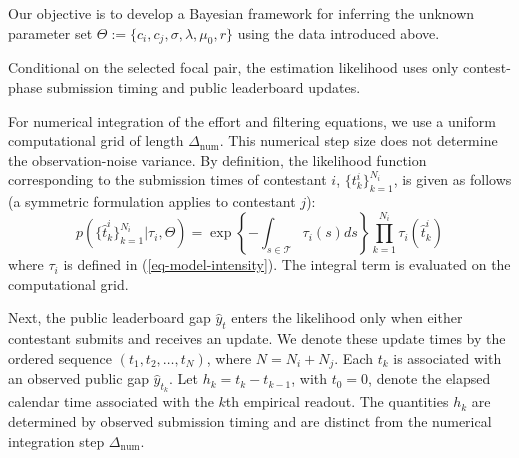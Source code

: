 \documentclass[mnsc]{informs3}
\begin{document}
Our objective is to develop a Bayesian framework for inferring the unknown parameter set $\Theta := \{ c_i, c_j, \sigma, \lambda, \mu_0,r \}$ using the data introduced above.

Conditional on the selected focal pair, the estimation likelihood uses only contest-phase submission timing and public leaderboard updates.

For numerical integration of the effort and filtering equations, we use a uniform computational grid of length $\Delta_{\mathrm{num}}$. This numerical step size does not determine the observation-noise variance.
By definition, the likelihood function corresponding to the submission times of contestant $i$, $\{t^i_k\}_{k=1}^{N_i}$, is given as follows (a symmetric formulation applies to contestant $j$):
\begin{equation}\label{eq-ihpp-prob}
p\left(\{\hat{t}^i_k\}_{k=1}^{N_i} | \tau_i, \Theta\right) = \exp\left\{-\int_{s\in\mathcal{T}}\tau_i(s)ds\right\}\prod_{k=1}^{N_i}\tau_i(\hat{t}^i_k)
\end{equation}
where $\tau_i$ is defined in (\ref{eq-model-intensity}).
The integral term is evaluated on the computational grid.

Next, the public leaderboard gap $\hat y_t$ enters the likelihood only when either contestant submits and receives an update.
We denote these update times by the ordered sequence $(t_1,t_2,\ldots,t_N)$, where $N=N_i+N_j$.
Each $t_k$ is associated with an observed public gap $\hat{y}_{t_k}$.
Let $h_k=t_k-t_{k-1}$, with $t_0=0$, denote the elapsed calendar time associated with the $k$th empirical readout. The quantities $h_k$ are determined by observed submission timing and are distinct from the numerical integration step $\Delta_{\mathrm{num}}$.
\end{document}
